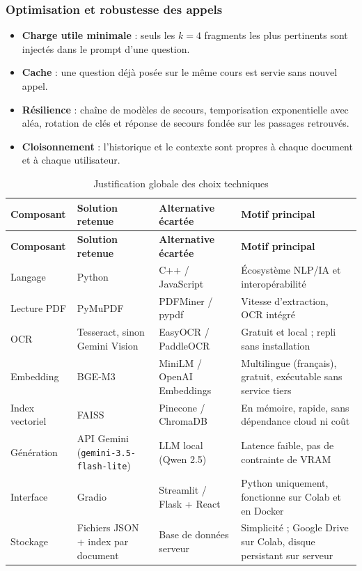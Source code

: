 \documentclass[12pt,a4paper,oneside]{report}
\begin{document}
\subsubsection*{Optimisation et robustesse des appels}

\begin{itemize}[nosep]
  \item \textbf{Charge utile minimale} : seuls les $k = 4$ fragments les plus pertinents sont injectés dans le prompt d'une question.
  \item \textbf{Cache} : une question déjà posée sur le même cours est servie sans nouvel appel.
  \item \textbf{Résilience} : chaîne de modèles de secours, temporisation exponentielle avec aléa, rotation de clés et réponse de secours fondée sur les passages retrouvés.
  \item \textbf{Cloisonnement} : l'historique et le contexte sont propres à chaque document et à chaque utilisateur.
\end{itemize}

\begin{longtable}{p{}|p{}|p{}|p{}}
\caption{Justification globale des choix techniques}\label{tab:choix}\\
\hline
\textbf{Composant} & \textbf{Solution retenue} & \textbf{Alternative écartée} & \textbf{Motif principal} \\ \hline
\endfirsthead
\hline
\textbf{Composant} & \textbf{Solution retenue} & \textbf{Alternative écartée} & \textbf{Motif principal} \\ \hline
\endhead
Langage & Python & C++ / JavaScript & Écosystème NLP/IA et interopérabilité \\ \hline
Lecture PDF & PyMuPDF & PDFMiner / pypdf & Vitesse d'extraction, OCR intégré \\ \hline
OCR & Tesseract, sinon Gemini Vision & EasyOCR / PaddleOCR & Gratuit et local ; repli sans installation \\ \hline
Embedding & BGE-M3 & MiniLM / OpenAI Embeddings & Multilingue (français), gratuit, exécutable sans service tiers \\ \hline
Index vectoriel & FAISS & Pinecone / ChromaDB & En mémoire, rapide, sans dépendance cloud ni coût \\ \hline
Génération & API Gemini (\texttt{gemini-3.5-\allowbreak flash-lite}) & LLM local (Qwen 2.5) & Latence faible, pas de contrainte de VRAM \\ \hline
Interface & Gradio & Streamlit / Flask + React & Python uniquement, fonctionne sur Colab et en Docker \\ \hline
Stockage & Fichiers JSON + index par document & Base de données serveur & Simplicité ; Google Drive sur Colab, disque persistant sur serveur \\ \hline
\end{longtable}
\end{document}
